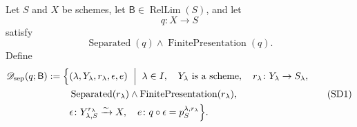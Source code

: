 \begin{definition}
  \label{def:nagata-separated-descent-stage}

  Let $S$ and $X$ be schemes, let
  \(\mathsf B\in\operatorname{RelLim}(S)\), and let
  \[
    q\colon X\longrightarrow S
  \]
  satisfy
  \[
    \operatorname{Separated}(q)\wedge
      \operatorname{FinitePresentation}(q).
  \]
  Define
  \[
  \begin{split}
    \mathscr D_{\mathrm{sep}}(q;\mathsf B)
      :=\Bigl\{&
       (\lambda,Y_\lambda,r_\lambda,\epsilon,e)\ \Bigm|\;
       \lambda\in I,\quad
       Y_\lambda\text{ is a scheme},\quad
       r_\lambda\colon Y_\lambda\to S_\lambda,\\
       &\operatorname{Separated}(r_\lambda)
          \wedge\operatorname{FinitePresentation}(r_\lambda),\\
       &\epsilon\colon
          Y_{\lambda,S}^{r_\lambda}\xrightarrow{\sim}X,\quad
       e\colon q\circ\epsilon=p_S^{\lambda,r_\lambda}
       \Bigr\}.
  \end{split}                                                       \tag{SD1}
  \]


\end{definition}
